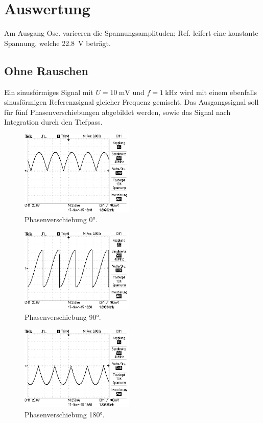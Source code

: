 \section{Auswertung}
\label{sec:Auswertung}
Am Ausgang Osc. varieeren die Spannungsamplituden; Ref. leifert eine konstante Spannung, welche \SI {22,8}{\volt} beträgt.

\subsection{Ohne Rauschen}
Ein sinusförmiges Signal mit $U = \SI{10}{\milli \volt}$ und $f = \SI{1}{\kilo \Hz}$ wird mit einem ebenfalls sinusförmigen Referenzsignal gleicher Frequenz gemischt. Das Ausgangssignal soll für fünf Phasenverschiebungen abgebildet werden, sowie das Signal nach Integration durch den Tiefpass.

\begin{figure}
  \centering
  \includegraphics[width=0.48\textwidth]{bilder/Ohne Rauschen/1.JPG}
  \caption{Phasenverschiebung 0°.}
  \label{fig:bild1}
\end{figure}

\begin{figure}
  \centering
  \includegraphics[width=0.48\textwidth]{bilder/Ohne Rauschen/2.JPG}
  \caption{Phasenverschiebung 90°.}
  \label{fig:bild2}
\end{figure}

\begin{figure}
  \centering
  \includegraphics[width=0.48\textwidth]{bilder/Ohne Rauschen/3.JPG}
  \caption{Phasenverschiebung 180°.}
  \label{fig:bild3}
\end{figure}

